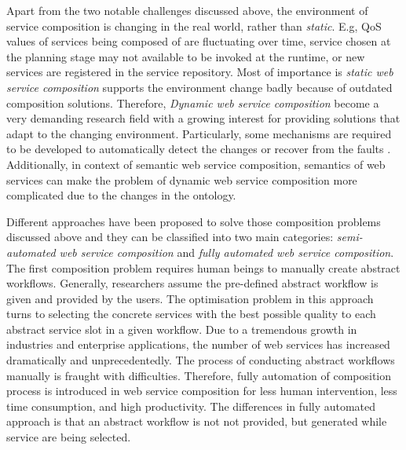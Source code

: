 Apart from the two notable challenges discussed above, the environment of service composition is changing in the real world, rather than \emph{static}. E.g, QoS values of services being composed of are fluctuating over time, service chosen at the planning stage may not available to be invoked at the runtime, or new services are registered in the service repository. Most of importance is \emph{static web service composition} supports the environment change badly because of outdated composition solutions. Therefore, \emph{Dynamic web service composition} become a very demanding research field with a growing interest for providing solutions that adapt to the changing environment. Particularly, some mechanisms are required to be developed to automatically detect the changes or recover from the faults \cite{chan2009fault}. Additionally, in context of semantic web service composition, semantics of web services can make the problem of dynamic web service composition more complicated due to the changes in the ontology.


Different approaches have been proposed to solve those composition problems discussed above and they can be classified into two main categories: \emph{semi-automated web service composition} and \emph{fully automated web service composition}. The first composition problem requires human beings to manually create abstract workflows. Generally, researchers assume the pre-defined abstract workflow is given and provided by the users. The optimisation problem in this approach turns to selecting the concrete services with the best possible quality to each abstract service slot in a given workflow. Due to a tremendous growth in industries and enterprise applications, the number of web services has increased dramatically and unprecedentedly. The process of conducting abstract workflows  manually is fraught with difficulties. Therefore, fully automation of composition process is introduced in web service composition for less human intervention, less time consumption, and high productivity. The differences in fully automated approach is that an abstract workflow is not not provided, but generated while service are being selected. 


